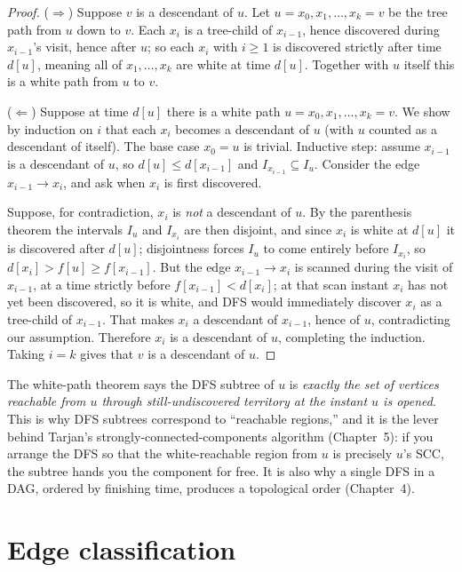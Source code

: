 \begin{proof}
($\Rightarrow$) Suppose $v$ is a descendant of $u$. Let $u=x_0,x_1,\dots,x_k=v$ be the tree path from $u$ down to $v$. Each $x_{i}$ is a tree-child of $x_{i-1}$, hence discovered during $x_{i-1}$'s visit, hence after $u$; so each $x_i$ with $i\ge 1$ is discovered strictly after time $d[u]$, meaning all of $x_1,\dots,x_k$ are white at time $d[u]$. Together with $u$ itself this is a white path from $u$ to $v$.

($\Leftarrow$) Suppose at time $d[u]$ there is a white path $u=x_0,x_1,\dots,x_k=v$. We show by induction on $i$ that each $x_i$ becomes a descendant of $u$ (with $u$ counted as a descendant of itself). The base case $x_0=u$ is trivial. Inductive step: assume $x_{i-1}$ is a descendant of $u$, so $d[u]\le d[x_{i-1}]$ and $I_{x_{i-1}}\subseteq I_u$. Consider the edge $x_{i-1}\to x_i$, and ask when $x_i$ is first discovered.

Suppose, for contradiction, $x_i$ is \emph{not} a descendant of $u$. By the parenthesis theorem the intervals $I_u$ and $I_{x_i}$ are then disjoint, and since $x_i$ is white at $d[u]$ it is discovered after $d[u]$; disjointness forces $I_u$ to come entirely before $I_{x_i}$, so $d[x_i]>f[u]\ge f[x_{i-1}]$. But the edge $x_{i-1}\to x_i$ is scanned during the visit of $x_{i-1}$, at a time strictly before $f[x_{i-1}]<d[x_i]$; at that scan instant $x_i$ has not yet been discovered, so it is white, and DFS would immediately discover $x_i$ as a tree-child of $x_{i-1}$. That makes $x_i$ a descendant of $x_{i-1}$, hence of $u$, contradicting our assumption. Therefore $x_i$ is a descendant of $u$, completing the induction. Taking $i=k$ gives that $v$ is a descendant of $u$.
\end{proof}

\begin{whybox}
The white-path theorem says the DFS subtree of $u$ is \emph{exactly the set of vertices reachable from $u$ through still-undiscovered territory at the instant $u$ is opened}. This is why DFS subtrees correspond to ``reachable regions,'' and it is the lever behind Tarjan's strongly-connected-components algorithm (Chapter~5): if you arrange the DFS so that the white-reachable region from $u$ is precisely $u$'s SCC, the subtree hands you the component for free. It is also why a single DFS in a DAG, ordered by finishing time, produces a topological order (Chapter~4).
\end{whybox}

\section{Edge classification}
\label{ch03:edge-types}


